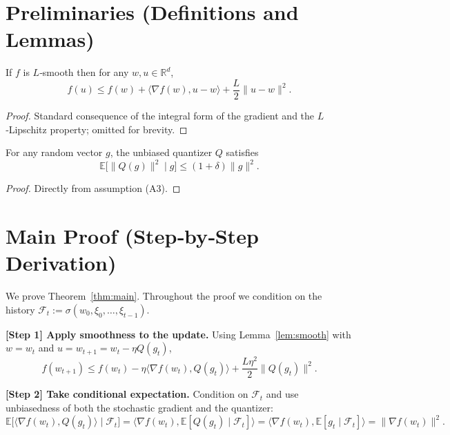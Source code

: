 \documentclass{article}
\begin{document}
\section*{Preliminaries (Definitions and Lemmas)}
\begin{lemma}\label{lem:smooth}
If $f$ is $L$‑smooth then for any $w,u\in\mathbb{R}^d$,
\[
f(u)\le f(w)+\langle\nabla f(w),u-w\rangle+\frac{L}{2}\|u-w\|^2.
\tag{4}
\]
\end{lemma}
\begin{proof}
Standard consequence of the integral form of the gradient and the
$L$‑Lipschitz property; omitted for brevity. \qedhere
\end{proof}

\begin{lemma}\label{lem:quant}
For any random vector $g$, the unbiased quantizer $Q$ satisfies
\[
\mathbb{E}\!\big[\|Q(g)\|^2\mid g\big]
\le (1+\delta)\|g\|^2.
\tag{5}
\]
\end{lemma}
\begin{proof}
Directly from assumption (A3). \qedhere
\end{proof}

\section*{Main Proof (Step‑by‑Step Derivation)}
We prove Theorem~\ref{thm:main}.  Throughout the proof we condition on the
history $\mathcal{F}_t:=\sigma(w_0,\xi_0,\dots,\xi_{t-1})$.

\bigskip
\noindent\textbf{[Step 1] Apply smoothness to the update.}
Using Lemma~\ref{lem:smooth} with $w=w_t$ and $u=w_{t+1}=w_t-\eta Q(g_t)$,
\[
f(w_{t+1})\le f(w_t)-\eta\langle\nabla f(w_t),Q(g_t)\rangle
+\frac{L\eta^2}{2}\|Q(g_t)\|^2.
\tag{6}
\]

\noindent\textbf{[Step 2] Take conditional expectation.}
Condition on $\mathcal{F}_t$ and use unbiasedness of both the stochastic
gradient and the quantizer:
\[
\mathbb{E}\!\big[\langle\nabla f(w_t),Q(g_t)\rangle\mid\mathcal{F}_t\big]
= \langle\nabla f(w_t),\mathbb{E}[Q(g_t)\mid\mathcal{F}_t]\rangle
= \langle\nabla f(w_t),\mathbb{E}[g_t\mid\mathcal{F}_t]\rangle
= \|\nabla f(w_t)\|^2.
\tag{7}
\]
\end{document}
